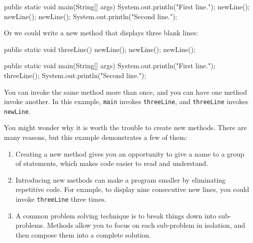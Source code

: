 \documentclass[12pt]{book}
\theoremstyle{exercise}
\newcommand{\java}[1]{\verb"#1"}
\begin{document}
\begin{code}
    public static void main(String[] args) {
        System.out.println("First line.");
        newLine();
        newLine();
        newLine();
        System.out.println("Second line.");
    }
\end{code}

Or we could write a new method that displays three blank lines:

\begin{code}
    public static void threeLine() {
        newLine();
        newLine();
        newLine();
    }

    public static void main(String[] args) {
        System.out.println("First line.");
        threeLine();
        System.out.println("Second line.");
    }
\end{code}

You can invoke the same method more than once, and you can have one method invoke another.
In this example, \java{main} invokes \java{threeLine}, and \java{threeLine} invokes \java{newLine}.

You might wonder why it is worth the trouble to create new methods.
There are many reasons, but this example demonstrates a few of them:

\begin{enumerate}

\item Creating a new method gives you an opportunity to give a name to a group of statements, which makes code easier to read and understand.

\item Introducing new methods can make a program smaller by eliminating repetitive code.
For example, to display nine consecutive new lines, you could invoke \java{threeLine} three times.

\item A common problem solving technique is to break things down into sub-problems.
Methods allow you to focus on each sub-problem in isolation, and then compose them into a complete solution.

\end{enumerate}

\end{document}
